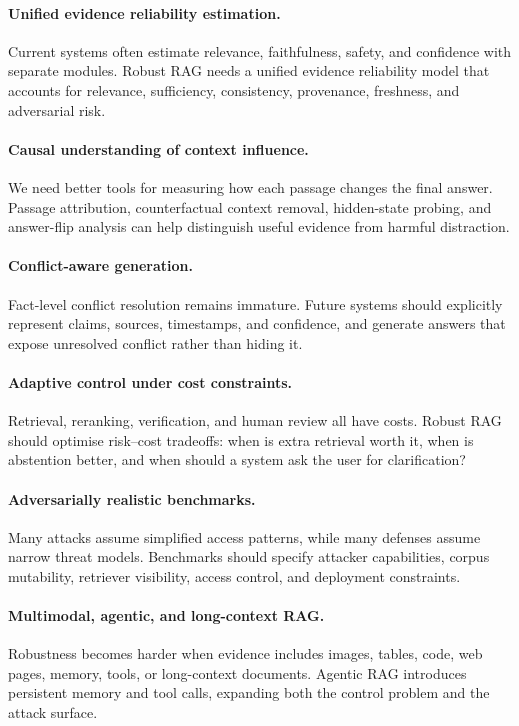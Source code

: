 
\paragraph{Unified evidence reliability estimation.}
Current systems often estimate relevance, faithfulness, safety, and confidence with separate modules. Robust RAG needs a unified evidence reliability model that accounts for relevance, sufficiency, consistency, provenance, freshness, and adversarial risk.

\paragraph{Causal understanding of context influence.}
We need better tools for measuring how each passage changes the final answer. Passage attribution, counterfactual context removal, hidden-state probing, and answer-flip analysis can help distinguish useful evidence from harmful distraction.

\paragraph{Conflict-aware generation.}
Fact-level conflict resolution remains immature. Future systems should explicitly represent claims, sources, timestamps, and confidence, and generate answers that expose unresolved conflict rather than hiding it.

\paragraph{Adaptive control under cost constraints.}
Retrieval, reranking, verification, and human review all have costs. Robust RAG should optimise risk--cost tradeoffs: when is extra retrieval worth it, when is abstention better, and when should a system ask the user for clarification?

\paragraph{Adversarially realistic benchmarks.}
Many attacks assume simplified access patterns, while many defenses assume narrow threat models. Benchmarks should specify attacker capabilities, corpus mutability, retriever visibility, access control, and deployment constraints.

\paragraph{Multimodal, agentic, and long-context RAG.}
Robustness becomes harder when evidence includes images, tables, code, web pages, memory, tools, or long-context documents. Agentic RAG introduces persistent memory and tool calls, expanding both the control problem and the attack surface.

